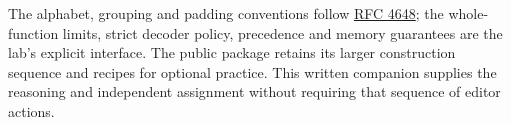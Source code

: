 The alphabet, grouping and padding conventions follow
\href{https://www.rfc-editor.org/rfc/rfc4648.html}{RFC 4648}; the whole-function
limits, strict decoder policy, precedence and memory guarantees are the lab's
explicit interface. The public package retains its larger construction sequence
and recipes for optional practice. This written companion supplies the reasoning
and independent assignment without requiring that sequence of editor actions.
